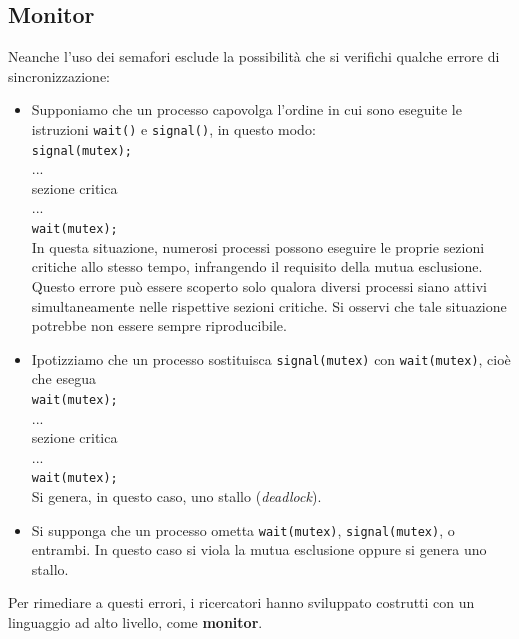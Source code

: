 \documentclass[11pt,a4paper]{article}
\begin{document}
\subsection{Monitor}
Neanche l'uso dei semafori esclude la possibilità che si verifichi qualche
errore di sincronizzazione:
\begin{itemize}[leftmargin=*]
  \item Supponiamo che un processo capovolga l'ordine in cui sono eseguite le istruzioni \texttt{wait()} e \texttt{signal()}, in questo modo:\medskip\\
  \texttt{signal(mutex);}\\
  ...\\
  sezione critica\\
  ...\\
  \texttt{wait(mutex);}\medskip\\
  In questa situazione, numerosi processi possono eseguire le proprie sezioni critiche allo stesso tempo, infrangendo il requisito della mutua esclusione. Questo errore può esse­re scoperto solo qualora diversi processi siano attivi simultaneamente nelle rispettive sezioni critiche. Si osservi che tale situazione potrebbe non essere sempre riproducibile.

  \item Ipotizziamo che un processo sostituisca \texttt{signal(mutex)} con \texttt{wait(mutex)}, cioè che esegua\medskip\\
  \texttt{wait(mutex);}\\
  ...\\
  sezione critica\\
  ...\\
  \texttt{wait(mutex);}\medskip\\
  Si genera, in questo caso, uno stallo (\emph{deadlock}).

  \item Si supponga che un processo ometta \texttt{wait(mutex)}, \texttt{signal(mutex)}, o entrambi.
  In questo caso si viola la mutua esclusione oppure si genera uno stallo.
\end{itemize}
%
Per rimediare a questi errori, i ricercatori hanno sviluppato costrutti con un linguaggio
ad alto livello, come \textbf{monitor}.
\end{document}
